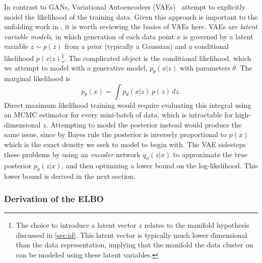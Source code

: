 In contrast to GANs, Variational Autoencoders (VAEs)~\cite{Kingma:2013vae} attempt to explicitly model the likelihood of the training data.
Given this approach is important to the unfolding work in , it is worth reviewing the basics of VAEs here.
VAEs are \textit{latent variable models}, in which generation of each data point $x$ is governed by a latent variable $z \sim p(z)$ from a prior (typically a Gaussian) and a conditional likelihood $p(x | z)$\footnote{The choice to introduce a latent vector $z$ relates to the manifold hypothesis discussed in \cref{sec:id}. This latent vector is typically much lower dimensional than the data representation, implying that the manifold the data cluster on can be modeled using these latent variables.}.
The complicated object is the conditional likelihood, which we attempt to model with a generative model, $p_{\theta}(x | z)$ with parameters $\theta$.
The marginal likelihood is
\begin{equation}
    p_\theta(x) = \int p_\theta(x | z)\, p(z)\, dz.
    \label{eqn:marginal}
\end{equation}
Direct maximum likelihood training would require evaluating this integral using an MCMC estimator for every mini-batch of data, which is intractable for high-dimensional $z$.
Attempting to model the posterior instead would produce the same issue, since by Bayes rule the posterior is inversely proportional to $p(x)$ which is the exact density we seek to model to begin with.
The VAE sidesteps these problems by using an \textit{encoder} network $q_\phi(z | x)$ to approximate the true posterior $p_\theta(z | x)$, and then optimizing a lower bound on the log-likelihood.
This lower bound is derived in the next section.

\subsubsection{Derivation of the ELBO}

